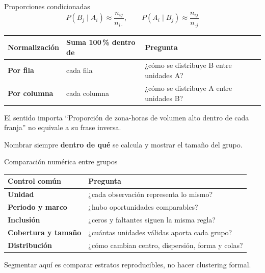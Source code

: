 \documentclass[aspectratio=169,11pt]{beamer}
\begin{document}
\begin{frame}{Proporciones condicionadas}
  \small
  \[
    P(B_j\mid A_i)\approx\frac{n_{ij}}{n_{i\cdot}},\qquad
    P(A_i\mid B_j)\approx\frac{n_{ij}}{n_{\cdot j}}
  \]
  \begin{tabularx}{\textwidth}{>{\bfseries}p{} p{} X}
    \toprule
    Normalización & Suma 100\,\% dentro de & Pregunta \\
    \midrule
    Por fila & cada fila & ¿cómo se distribuye B entre unidades A? \\
    Por columna & cada columna & ¿cómo se distribuye A entre unidades B? \\
    \bottomrule
  \end{tabularx}
  \vfill
  \begin{alertblock}{El sentido importa}
    ``Proporción de zona-horas de volumen alto dentro de cada franja'' no equivale a su frase inversa.
  \end{alertblock}
  \centering Nombrar siempre \textbf{dentro de qué} se calcula y mostrar el tamaño del grupo.
\end{frame}

\begin{frame}{Comparación numérica entre grupos}
  \small
  \begin{tabularx}{\textwidth}{>{\bfseries}p{} X}
    \toprule
    Control común & Pregunta \\
    \midrule
    Unidad & ¿cada observación representa lo mismo? \\
    Periodo y marco & ¿hubo oportunidades comparables? \\
    Inclusión & ¿ceros y faltantes siguen la misma regla? \\
    Cobertura y tamaño & ¿cuántas unidades válidas aporta cada grupo? \\
    Distribución & ¿cómo cambian centro, dispersión, forma y colas? \\
    \bottomrule
  \end{tabularx}
  \vspace{.7em}
  \centering
  \par\alert{Segmentar aquí es comparar estratos reproducibles, no hacer clustering formal.}
\end{frame}
\end{document}
